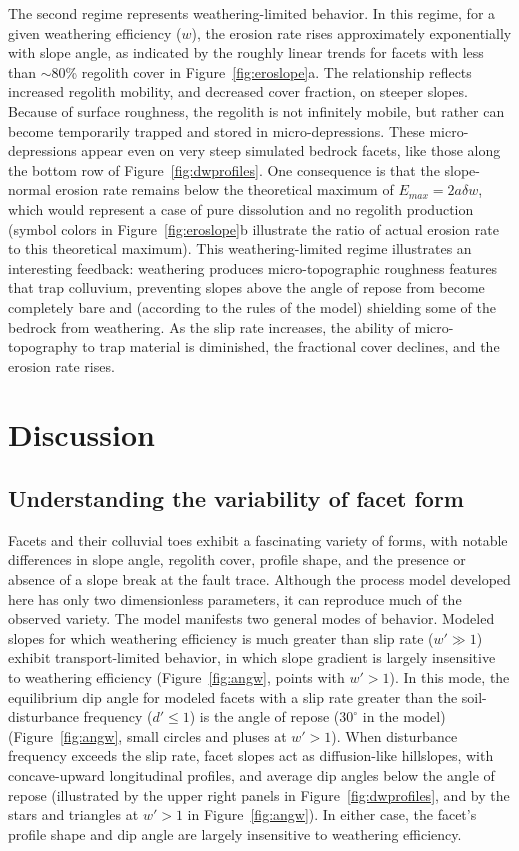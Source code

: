The second regime represents weathering-limited behavior. In this regime, for a given weathering efficiency ($w$), the erosion rate rises approximately exponentially with slope angle, as indicated by the roughly linear trends for facets with less than $\sim$80\% regolith cover in Figure~\ref{fig:eroslope}a. The relationship reflects increased regolith mobility, and decreased cover fraction, on steeper slopes. Because of surface roughness, the regolith is not infinitely mobile, but rather can become temporarily trapped and stored in micro-depressions. These micro-depressions appear even on very steep simulated bedrock facets, like those along the bottom row of Figure~\ref{fig:dwprofiles}. One consequence is that the slope-normal erosion rate remains below  the theoretical maximum of $E_{max} = 2a\delta w$, which would represent a case of pure dissolution and no regolith production (symbol colors in Figure~\ref{fig:eroslope}b illustrate the ratio of actual erosion rate to this theoretical maximum). This weathering-limited regime illustrates an interesting feedback: weathering produces micro-topographic roughness features that trap colluvium, preventing slopes above the angle of repose from become completely bare and (according to the rules of the model) shielding some of the bedrock from weathering. As the slip rate increases, the ability of micro-topography to trap material is diminished, the fractional cover declines, and the erosion rate rises.


\section{Discussion}

\subsection{Understanding the variability of facet form}

Facets and their colluvial toes exhibit a fascinating variety of forms, with notable differences in slope angle, regolith cover, profile shape, and the presence or absence of a slope break at the fault trace. Although the process model developed here has only two dimensionless parameters, it can reproduce much of the observed variety. The model manifests two general modes of behavior. Modeled slopes for which weathering efficiency is much greater than slip rate ($w' \gg 1$) exhibit transport-limited behavior, in which slope gradient is largely insensitive to weathering efficiency (Figure~\ref{fig:angw}, points with $w' > 1$). In this mode, the equilibrium dip angle for modeled facets with a slip rate greater than the soil-disturbance frequency ($d' \le 1$) is the angle of repose ($30^\circ$ in the model) (Figure~\ref{fig:angw}, small circles and pluses at $w'>1$). When disturbance frequency exceeds the slip rate, facet slopes act as diffusion-like hillslopes, with concave-upward longitudinal profiles, and average dip angles below the angle of repose (illustrated by the upper right panels in Figure~\ref{fig:dwprofiles}, and by the stars and triangles at $w' > 1$ in Figure~\ref{fig:angw}). In either case, the facet's profile shape and dip angle are largely insensitive to weathering efficiency.

